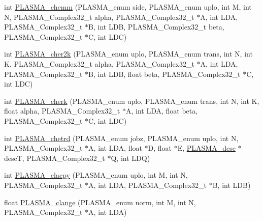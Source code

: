 \begin{DoxyCompactItemize}
\item 
int \hyperlink{group__PLASMA__Complex32__t_ga5eccc301c2b8ed5497c8149d002d3ca8_ga5eccc301c2b8ed5497c8149d002d3ca8}{P\+L\+A\+S\+M\+A\+\_\+chemm} (P\+L\+A\+S\+M\+A\+\_\+enum side, P\+L\+A\+S\+M\+A\+\_\+enum uplo, int M, int N, P\+L\+A\+S\+M\+A\+\_\+\+Complex32\+\_\+t alpha, P\+L\+A\+S\+M\+A\+\_\+\+Complex32\+\_\+t $\ast$A, int L\+D\+A, P\+L\+A\+S\+M\+A\+\_\+\+Complex32\+\_\+t $\ast$B, int L\+D\+B, P\+L\+A\+S\+M\+A\+\_\+\+Complex32\+\_\+t beta, P\+L\+A\+S\+M\+A\+\_\+\+Complex32\+\_\+t $\ast$C, int L\+D\+C)
\item 
int \hyperlink{group__PLASMA__Complex32__t_ga2174f460c8b3a319d83f5890688c53af_ga2174f460c8b3a319d83f5890688c53af}{P\+L\+A\+S\+M\+A\+\_\+cher2k} (P\+L\+A\+S\+M\+A\+\_\+enum uplo, P\+L\+A\+S\+M\+A\+\_\+enum trans, int N, int K, P\+L\+A\+S\+M\+A\+\_\+\+Complex32\+\_\+t alpha, P\+L\+A\+S\+M\+A\+\_\+\+Complex32\+\_\+t $\ast$A, int L\+D\+A, P\+L\+A\+S\+M\+A\+\_\+\+Complex32\+\_\+t $\ast$B, int L\+D\+B, float beta, P\+L\+A\+S\+M\+A\+\_\+\+Complex32\+\_\+t $\ast$C, int L\+D\+C)
\item 
int \hyperlink{group__PLASMA__Complex32__t_ga218b2a902b2a05b10c19161c88b2065a_ga218b2a902b2a05b10c19161c88b2065a}{P\+L\+A\+S\+M\+A\+\_\+cherk} (P\+L\+A\+S\+M\+A\+\_\+enum uplo, P\+L\+A\+S\+M\+A\+\_\+enum trans, int N, int K, float alpha, P\+L\+A\+S\+M\+A\+\_\+\+Complex32\+\_\+t $\ast$A, int L\+D\+A, float beta, P\+L\+A\+S\+M\+A\+\_\+\+Complex32\+\_\+t $\ast$C, int L\+D\+C)
\item 
int \hyperlink{group__PLASMA__Complex32__t_ga72efb6e6664acbda79f267c167eae41c_ga72efb6e6664acbda79f267c167eae41c}{P\+L\+A\+S\+M\+A\+\_\+chetrd} (P\+L\+A\+S\+M\+A\+\_\+enum jobz, P\+L\+A\+S\+M\+A\+\_\+enum uplo, int N, P\+L\+A\+S\+M\+A\+\_\+\+Complex32\+\_\+t $\ast$A, int L\+D\+A, float $\ast$D, float $\ast$E, \hyperlink{structplasma__desc__t}{P\+L\+A\+S\+M\+A\+\_\+desc} $\ast$desc\+T, P\+L\+A\+S\+M\+A\+\_\+\+Complex32\+\_\+t $\ast$Q, int L\+D\+Q)
\item 
int \hyperlink{group__PLASMA__Complex32__t_ga898cba57b9144416a37de9c72386c58a_ga898cba57b9144416a37de9c72386c58a}{P\+L\+A\+S\+M\+A\+\_\+clacpy} (P\+L\+A\+S\+M\+A\+\_\+enum uplo, int M, int N, P\+L\+A\+S\+M\+A\+\_\+\+Complex32\+\_\+t $\ast$A, int L\+D\+A, P\+L\+A\+S\+M\+A\+\_\+\+Complex32\+\_\+t $\ast$B, int L\+D\+B)
\item 
float \hyperlink{group__PLASMA__Complex32__t_gaaab2b12f7ba721c391c670feb35d8def_gaaab2b12f7ba721c391c670feb35d8def}{P\+L\+A\+S\+M\+A\+\_\+clange} (P\+L\+A\+S\+M\+A\+\_\+enum norm, int M, int N, P\+L\+A\+S\+M\+A\+\_\+\+Complex32\+\_\+t $\ast$A, int L\+D\+A)

\end{DoxyCompactItemize}

